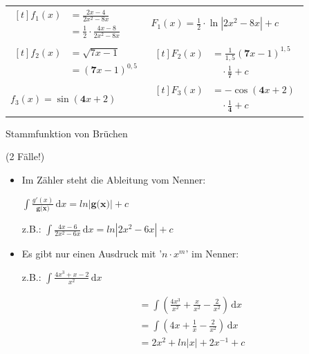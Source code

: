 \begin{antwort}\begin{center}
	\begin{tabularx}{\textwidth}{>{\raggedright\arraybackslash}X | >{\raggedright\arraybackslash}X}
		\multicolumn{1}{c|}{$f(x)$} & \multicolumn{1}{c}{$F(x)$} \\
		\hline
		$\begin{aligned}[t]
		f_1(x)&=\frac{2x-4}{2x^2-8x} \\
		&=\frac{1}{2}\cdot\frac{4x-8}{2x^2-8x}
		\end{aligned}$ & $F_1(x)=\frac{1}{2}\cdot \ln|2x^2-8x|+c$ \\[4ex]
		
		$\begin{aligned}[t]
			f_2(x) &= \sqrt{7x-1} \\
			&= (\mathbf{7}x-1)^{0,5}
		\end{aligned}$ & $\begin{aligned}[t] F_2(x)&=\frac{1}{1,5}(\mathbf{7}x-1)^{1,5}\\
		&\quad\cdot\frac{1}{\mathbf{7}}+c \end{aligned}$ \\[4ex]
		
		$f_3(x)=\sin(\mathbf{4}x+2)$ & $\begin{aligned}[t]F_3(x)&=-\cos(\mathbf{4}x+2)\\&\quad\cdot\frac{1}{\mathbf{4}}+c\end{aligned}$ \\
	\end{tabularx}
\end{center}\end{antwort}
\begin{frage}Stammfunktion von Brüchen
	
	(2 Fälle!)\end{frage}
\begin{antwort}\normalsize\begin{itemize}
	\item Im Zähler steht die Ableitung vom Nenner:
	
	$\displaystyle\int \! \frac{g'(x)}{\textbf{g(x)}} \, \mathrm{d}x=ln|\textbf{g(x)}|+c$
	
	z.B.: $\displaystyle\int \! \frac{4x-6}{{2x^2-6x}} \, \mathrm{d}x=ln|{2x^2-6x}|+c$
	\item Es gibt nur einen Ausdruck mit '$n \cdot x^m$' im Nenner:
	
	 z.B.: $\displaystyle\int \! \frac{4x^3+x-2}{{x^2}} \, \mathrm{d}x$
	 
	 \begin{align*}
	 &=\displaystyle\int \! (\frac{4x^3}{{x^2}}+\frac{x}{{x^2}}-\frac{2}{{x^2}}) \, \mathrm{d}x \\
	 &=\displaystyle\int \! (4x+\frac{1}{{x}}-\frac{2}{{x^2}}) \, \mathrm{d}x \\
	 &=\displaystyle 2x^2+ln|x|+2x^{-1}+c
	 \end{align*}
	\end{itemize}\end{antwort}
